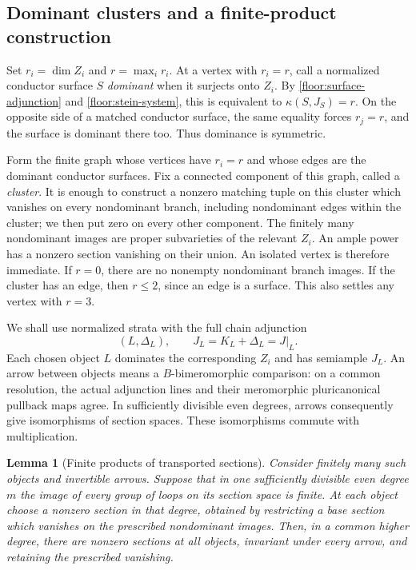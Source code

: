 \documentclass[11pt,letterpaper]{article}
\newtheorem{lemma}[theorem]{Lemma}
\theoremstyle{definition}
\theoremstyle{remark}
\begin{document}
\subsection{Dominant clusters and a finite-product construction}

Set $r_i=\dim Z_i$ and $r=\max_i r_i$.  At a vertex with $r_i=r$,
call a normalized conductor surface $S$ \emph{dominant} when it
surjects onto $Z_i$.  By \eqref{floor:surface-adjunction} and
\eqref{floor:stein-system}, this is equivalent to
$\kappa(S,J_S)=r$.  On the opposite side of a matched conductor
surface, the same equality forces $r_j=r$, and the surface is
dominant there too.  Thus dominance is symmetric.

Form the finite graph whose vertices have $r_i=r$ and whose edges
are the dominant conductor surfaces.  Fix a connected component
of this graph, called a \emph{cluster}.  It is enough to construct a
nonzero matching tuple on this cluster which vanishes on every
nondominant branch, including nondominant edges within the cluster;
we then put zero on every other component.  The finitely many
nondominant images are proper subvarieties of the relevant $Z_i$.
An ample power has a nonzero section vanishing on their union.
An isolated vertex is therefore immediate.  If $r=0$, there are no
nonempty nondominant branch images.  If the cluster has an edge,
then $r\le2$, since an edge is a surface.  This also settles any
vertex with $r=3$.

We shall use normalized strata with the full chain adjunction
\[
 (L,\Delta_L),\qquad J_L=K_L+\Delta_L=J|_L.
\]
Each chosen object $L$ dominates the corresponding $Z_i$ and has
semiample $J_L$.  An arrow between objects means a $B$-bimeromorphic
comparison: on a common resolution, the actual adjunction lines and
their meromorphic pluricanonical pullback maps agree.  In sufficiently
divisible even degrees, arrows consequently give isomorphisms of
section spaces.  These isomorphisms commute with multiplication.

\begin{lemma}[Finite products of transported sections]
\label{floor:products}
Consider finitely many such objects and invertible arrows.  Suppose
that in one sufficiently divisible even degree $m$ the image of
every group of loops on its section space is finite.  At each object
choose a nonzero section in that degree, obtained by restricting a
base section which vanishes on the prescribed nondominant images.
Then, in a common higher degree, there are nonzero sections at all
objects, invariant under every arrow, and retaining the prescribed
vanishing.
\end{lemma}
\end{document}
